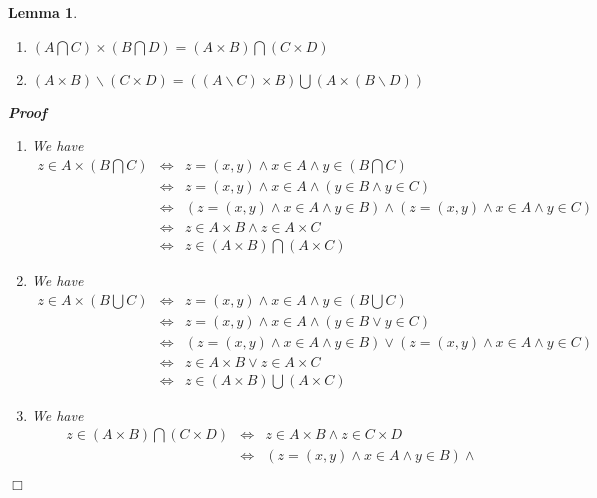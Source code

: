 \documentclass{book}
\newenvironment{proof}{\noindent\textbf{Proof\ }}{\hspace*{\fill}$\Box$\medskip}
\newtheorem{lemma}{Lemma}
\begin{document}
{{\begin{lemma}
\begin{enumerate}
    \item $\left( A \bigcap C \right) \times \left( B \bigcap D \right) = (A
    \times B) \bigcap (C \times D)$
    
    \item $(A \times B) \backslash (C \times D) = ((A\backslash C) \times B)
    \bigcup (A \times (B\backslash D))$
  \end{enumerate}
  \begin{proof}
    
    \begin{enumerate}
      \item We have
      \begin{eqnarray*}
        z \in A \times \left( B \bigcap C \right) & \Leftrightarrow & z = (x,
        y) \wedge x \in A \wedge y \in \left( B \bigcap C \right)\\
        & \Leftrightarrow & z = (x, y) \wedge x \in A \wedge (y \in B \wedge
        y \in C)\\
        & \Leftrightarrow & (z = (x, y) \wedge x \in A \wedge y \in B) \wedge
        (z = (x, y) \wedge x \in A \wedge y \in C)\\
        & \Leftrightarrow & z \in A \times B \wedge z \in A \times C\\
        & \Leftrightarrow & z \in (A \times B) \bigcap (A \times C)
      \end{eqnarray*}
      \item We have
      \begin{eqnarray*}
        z \in A \times \left( B \bigcup C \right) & \Leftrightarrow & z = (x,
        y) \wedge x \in A \wedge y \in \left( B \bigcup C \right)\\
        & \Leftrightarrow & z = (x, y) \wedge x \in A \wedge (y \in B \vee y
        \in C)\\
        & \Leftrightarrow & (z = (x, y) \wedge x \in A \wedge y \in B) \vee
        (z = (x, y) \wedge x \in A \wedge y \in C)\\
        & \Leftrightarrow & z \in A \times B \vee z \in A \times C\\
        & \Leftrightarrow & z \in (A \times B) \bigcup (A \times C)
      \end{eqnarray*}
      \item We have
      \begin{eqnarray*}
        z \in (A \times B) \bigcap (C \times D) & \Leftrightarrow & z \in A
        \times B \wedge z \in C \times D\\
        & \Leftrightarrow & (z = (x, y) \wedge x \in A \wedge y \in B) \wedge

\end{eqnarray*}
\end{enumerate}
\end{proof}
\end{lemma}}}
\end{document}
